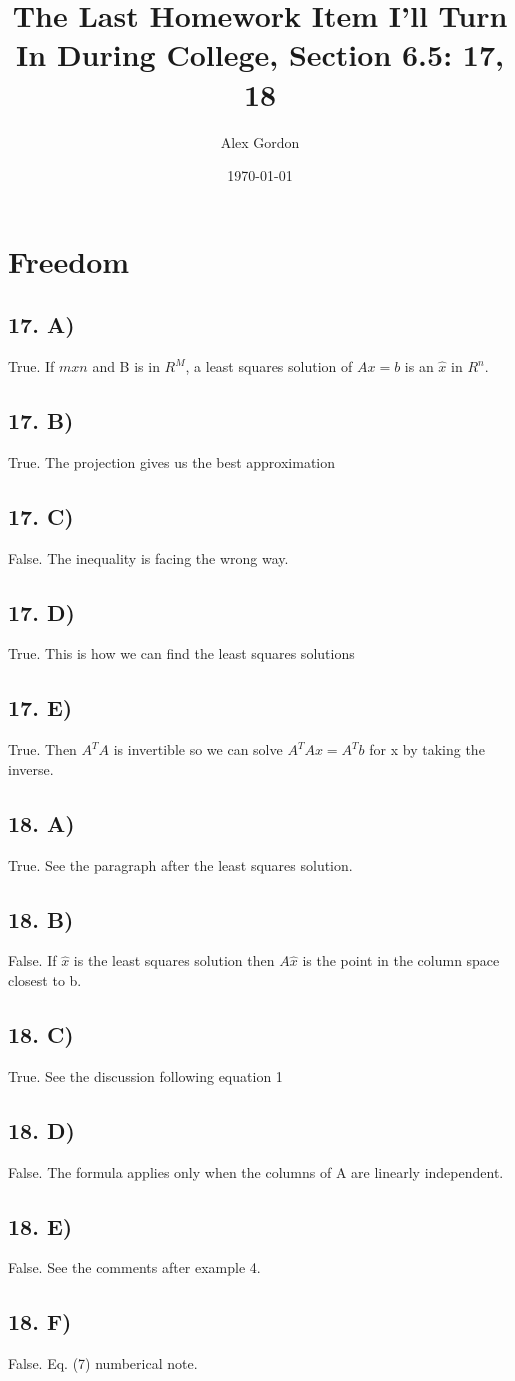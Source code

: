 \documentclass[12]{scrartcl}
\begin{document}
\title{The Last Homework Item I'll Turn In During College, Section 6.5: 17, 18}
\author{Alex Gordon}
\date{\today}
\maketitle
\section*{Freedom}
\subsection*{17. A)}
True. If $m x n$  and B is in $R^M$, a least squares solution of $Ax = b$ is an $\hat{x} $ in $R^n$. 
\subsection*{17. B)}
True. The projection gives us the best approximation
\subsection*{17. C)}
False. The inequality is facing the wrong way. 
\subsection*{17. D)}
True. This is how we can find the least squares solutions
\subsection*{17. E)}
True. Then $A^TA $ is invertible so we can solve $A^TAx = A^Tb $ for x by taking the inverse.  

\subsection*{18. A)}
True. See the paragraph after the least squares solution. 
\subsection*{18. B)}
False. If $\hat{x}$ is the least squares solution then $A \hat{x}$ is the point in the column space closest to b. 
\subsection*{18. C)}
True. See the discussion following equation 1
\subsection*{18. D)}
False. The formula applies only when the columns of A are linearly independent.  
\subsection*{18. E)}
False. See the comments after example 4.
\subsection*{18. F)}
False. Eq. (7) numberical note. 
\end{document}
